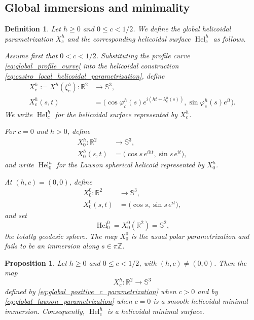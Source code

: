 \documentclass[a4paper,11pt]{amsart}
\numberwithin{equation}{section}
\theoremstyle{plain}
\newtheorem{prop}[thm]{Proposition}
\newtheorem{defn}[thm]{Definition}
\begin{document}
\subsection{Global immersions and minimality}

\begin{defn}
\label{def:global_parametrizations}
Let $h\geq0$ and $0\le c<1/2$. We define the global helicoidal parametrization
$X_c^h$ and the corresponding helicoidal surface
$\operatorname{Hel}_c^h$ as follows.

Assume first that $0<c<1/2$. Substituting the profile curve
\eqref{eq:global_profile_curve} into the helicoidal construction
\eqref{eq:castro_local_helicoidal_parametrization}, define
\begin{equation}\label{eq:global_positive_c_parametrization}
\begin{aligned}
X_c^h:=X^h(\xi_c^h):\mathbb R^2&\longrightarrow\mathbb S^3,\\
X_c^h(s,t)
&=
\bigl(
\cos\varphi_c^h(s)e^{i(ht+\lambda_c^h(s))},
\sin\varphi_c^h(s)e^{it}
\bigr).
\end{aligned}
\end{equation}
We write $\operatorname{Hel}_c^h$ for the helicoidal surface represented by
$X_c^h$.

For $c=0$ and $h>0$, define
\begin{equation}\label{eq:global_lawson_parametrization}
\begin{aligned}
X_0^h:\mathbb R^2&\longrightarrow\mathbb S^3,\\
X_0^h(s,t)
&=
\bigl(
\cos s\,e^{iht},
\sin s\,e^{it}
\bigr),
\end{aligned}
\end{equation}
and write $\operatorname{Hel}_0^h$ for the Lawson spherical helicoid
represented by $X_0^h$.

At $(h,c)=(0,0)$, define
\[
\begin{aligned}
X_0^0:\mathbb R^2&\longrightarrow\mathbb S^3,\\
X_0^0(s,t)&=\bigl(\cos s,\sin s\,e^{it}\bigr),
\end{aligned}
\]
and set
\[
\operatorname{Hel}_0^0=X_0^0(\mathbb R^2)=\mathbb S^2,
\]
the totally geodesic sphere. The map $X_0^0$ is the usual polar
parametrization and fails to be an immersion along $s\in\pi\mathbb Z$.
\end{defn}

\begin{prop}
\label{prop:global_minimal_immersion}
Let $h\geq0$ and $0\le c<1/2$, with $(h,c)\neq(0,0)$. Then the map
\[
X_c^h:\mathbb R^2\longrightarrow\mathbb S^3
\]
defined by \eqref{eq:global_positive_c_parametrization} when $c>0$
and by \eqref{eq:global_lawson_parametrization} when $c=0$ is a smooth
helicoidal minimal immersion. Consequently, $\operatorname{Hel}_c^h$ is a helicoidal
minimal surface.
\end{prop}
\end{document}
